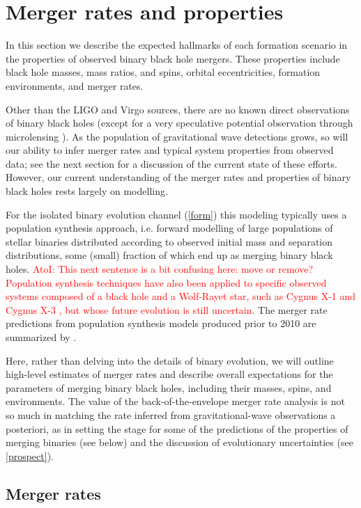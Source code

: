 \documentclass[iop,onecolumn]{revtex4}
\newcommand{\ajf}[1]{\textcolor{red}{AtoI: #1}}
\begin{document}
\section{Merger rates and properties}\label{merge}

In this section we describe the expected hallmarks of each formation scenario in the properties of observed binary black hole mergers. These properties include black hole masses, mass ratios, and spins, orbital eccentricities, formation environments, and merger rates.

Other than the LIGO and Virgo sources, there are no known direct observations of binary black holes (except for a very speculative potential observation through microlensing \citep{Dong:2007}). As the population of gravitational wave detections grows, so will our ability to infer merger rates and typical system properties from observed data; see the next section for a discussion of the current state of these efforts. However, our current understanding of the merger rates and properties of binary black holes rests largely on modelling. 

For the isolated binary evolution channel (\autoref{form}) this modeling typically uses a population synthesis approach, i.e. forward modelling of large populations of stellar binaries distributed according to observed initial mass and separation distributions, some (small) fraction of which end up as merging binary black holes. \ajf{This next sentence is a bit confusing here: move or remove? Population synthesis techniques have also been applied to specific observed systems composed of a black hole and a Wolf-Rayet star, such as Cygnus X-1 \citep{Bulik:2008} and Cygnus X-3 \citep{CygnusX3:2012}, but whose future evolution is still uncertain.}  The merger rate predictions from population synthesis models produced prior to 2010 are summarized by \citet{ratesdoc}. 

Here, rather than delving into the details of binary evolution, we will outline high-level estimates of merger rates and describe overall expectations for the parameters of merging binary black holes, including their masses, spins, and environments. The value of the back-of-the-envelope merger rate analysis is not so much in matching the rate inferred from gravitational-wave observations a posteriori, as in setting the stage for some of the predictions of the properties of merging binaries (see below) and the discussion of evolutionary uncertainties (see \autoref{prospect}).


\subsection{Merger rates}
\end{document}
